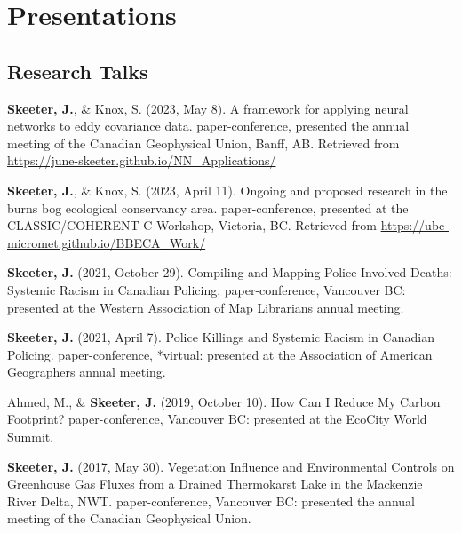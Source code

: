 \documentclass[
]{article}
\newlength{\cslhangindent}
\newlength{\cslentryspacingunit} %
\newenvironment{CSLReferences}[2] %
 {%
  \setlength{\parindent}{0pt}
  \ifodd #1
  \let\oldpar\par
  \def\par{\hangindent=\cslhangindent\oldpar}
  \fi
  \setlength{\parskip}{#2\cslentryspacingunit}
 }%
 {}
\begin{document}
\hypertarget{presentations}{%
\section{Presentations}\label{presentations}}

\hypertarget{research-talks}{%
\subsection{Research Talks}\label{research-talks}}

\hypertarget{refs-4.1}{}
\begin{CSLReferences}{1}{0}
\leavevmode{}%
\textbf{Skeeter, J.}, \& Knox, S. (2023, May 8). A framework for
applying neural networks to eddy covariance data. paper-conference,
presented the annual meeting of the Canadian Geophysical Union, Banff,
AB. Retrieved from \url{https://june-skeeter.github.io/NN_Applications/}

\leavevmode{}%
\textbf{Skeeter, J.}, \& Knox, S. (2023, April 11). Ongoing and proposed
research in the burns bog ecological conservancy area. paper-conference,
presented at the CLASSIC/COHERENT-C Workshop, Victoria, BC. Retrieved
from \url{https://ubc-micromet.github.io/BBECA_Work/}

\leavevmode{}%
\textbf{Skeeter, J.} (2021, October 29). Compiling and Mapping Police
Involved Deaths: Systemic Racism in Canadian Policing. paper-conference,
Vancouver BC: presented at the Western Association of Map Librarians
annual meeting.

\leavevmode{}%
\textbf{Skeeter, J.} (2021, April 7). Police Killings and Systemic
Racism in Canadian Policing. paper-conference, *virtual: presented at
the Association of American Geographers annual meeting.

\leavevmode{}%
Ahmed, M., \& \textbf{Skeeter, J.} (2019, October 10). How Can I Reduce
My Carbon Footprint? paper-conference, Vancouver BC: presented at the
EcoCity World Summit.

\leavevmode{}%
\textbf{Skeeter, J.} (2017, May 30). Vegetation Influence and
Environmental Controls on Greenhouse Gas Fluxes from a Drained
Thermokarst Lake in the Mackenzie River Delta, NWT. paper-conference,
Vancouver BC: presented the annual meeting of the Canadian Geophysical
Union.


\end{CSLReferences}
\end{document}
